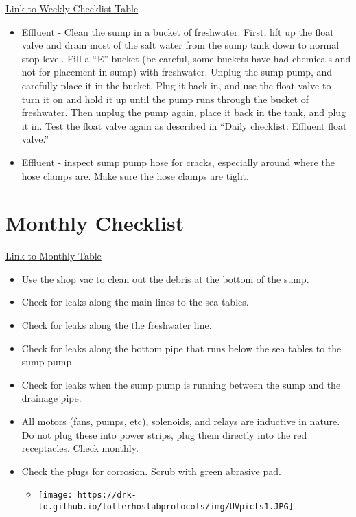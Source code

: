 \documentclass[
  letterpaper,
  DIV=11,
  numbers=noendperiod]{scrreprt}
\providecommand{\tightlist}{%
  \setlength{\itemsep}{0pt}\setlength{\parskip}{0pt}}\usepackage{longtable,booktabs,array}
\begin{document}
\href{https://docs.google.com/spreadsheets/d/1oQnhrPk-GJYOvP48skjc4ehimgx4G3M1Ne0vrJx371c/edit\#gid=1794014838}{Link
to Weekly Checklist Table}

\begin{itemize}
\item
  Effluent - Clean the sump in a bucket of freshwater. First, lift up
  the float valve and drain most of the salt water from the sump tank
  down to normal stop level. Fill a ``E'' bucket (be careful, some
  buckets have had chemicals and not for placement in sump) with
  freshwater. Unplug the sump pump, and carefully place it in the
  bucket. Plug it back in, and use the float valve to turn it on and
  hold it up until the pump runs through the bucket of freshwater. Then
  unplug the pump again, place it back in the tank, and plug it in. Test
  the float valve again as described in ``Daily checklist: Effluent
  float valve.''
\item
  Effluent - inspect sump pump hose for cracks, especially around where
  the hose clamps are. Make sure the hose clamps are tight.
\end{itemize}

\hypertarget{monthly-checklist}{%
\section*{\texorpdfstring{\textbf{Monthly
Checklist}}{Monthly Checklist}}\label{monthly-checklist}}

\href{https://docs.google.com/spreadsheets/d/1oQnhrPk-GJYOvP48skjc4ehimgx4G3M1Ne0vrJx371c/edit\#gid=626032260}{Link
to Monthly Table}

\begin{itemize}
\item
  Use the shop vac to clean out the debris at the bottom of the sump.
\item
  Check for leaks along the main lines to the sea tables.
\item
  Check for leaks along the the freshwater line.
\item
  Check for leaks along the bottom pipe that runs below the sea tables
  to the sump pump
\item
  Check for leaks when the sump pump is running between the sump and the
  drainage pipe.
\item
  All motors (fans, pumps, etc), solenoids, and relays are inductive in
  nature. Do not plug these into power strips, plug them directly into
  the red receptacles. Check monthly.
\item
  Check the plugs for corrosion. Scrub with green abrasive pad.

  \begin{itemize}
  \tightlist
  \item
    \texttt{[image: https://drk-lo.github.io/lotterhoslabprotocols/img/UVpicts1.JPG]}
  \end{itemize}
\end{itemize}
\end{document}
